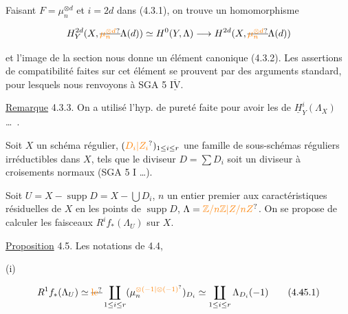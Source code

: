Faisant  $F=\mu_n^{\otimes d}$ et $i=2d$ dans (4.3.1), on trouve un homomorphisme

\[
H^{2d}_Y(X,\deleted{\unsure{\mu_n^{\otimes d}}}\Lambda(d))\simeq H^0(Y,\Lambda)\longrightarrow H^{2d}(X,\deleted{\unsure{\mu_n^{\otimes d}}}\Lambda(d))
\]

et l'image de la section   nous donne un élément canonique (4.3.2). Les assertions  de compatibilité faites  sur cet élément  se prouvent par des arguments standard, pour lesquels nous renvoyons à SGA 5 $\overline{\underline{\mathrm{IV}}}$.

\uline{Remarque} 4.3.3. On a  utilisé l'hyp. de pureté faite pour  avoir  les  de $\underline H^i_Y(\Lambda_X)$ \ldots\ .


 Soit $X$ un schéma régulier, $(\unsure{D_i|Z_i})_{1\leq i\leq r}$ une famille de  sous-schémas réguliers irréductibles dans $X$, tels que le diviseur $D=\sum D_i$ soit un diviseur à croisements normaux (SGA 5 I \ldots).

Soit $U=X-\operatorname{supp}D=X-\bigcup D_i$,  $n$ un entier premier aux caractéristiques résiduelles de $X$ en les points de  $\operatorname{supp}D$, $\Lambda=\unsure{\mathbb Z/n\mathbb Z|Z/nZ}$. On se propose de calculer les faisceaux $R^i f_*(\Lambda_U)$ sur $X$. 

\uline{Proposition} 4.5.  Les notations  de 4.4, 

(i)  

\[
R^1f_*(\Lambda_U)\simeq\deleted{\unsure{\text{le}}}\coprod_{1\leq i\leq r}(\mu_n^{\unsure{\otimes(-1|\otimes(-1)}})_{D_i}\simeq\coprod_{1\leq i\leq r}\Lambda_{D_i}(-1)
\tag*{(4.\deleted{4}5.1)}
\]

